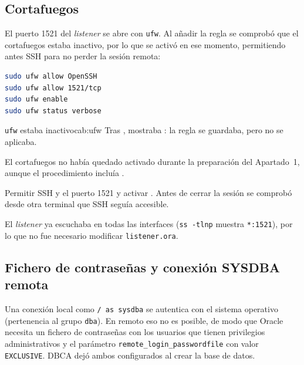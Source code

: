 \subsection{Cortafuegos}

El puerto 1521 del \textit{listener} se abre con \texttt{ufw}. Al añadir la regla se comprobó que el cortafuegos estaba inactivo, por lo que se activó en ese momento, permitiendo antes SSH para no perder la sesión remota:

\begin{lstlisting}[language=bash]
sudo ufw allow OpenSSH
sudo ufw allow 1521/tcp
sudo ufw enable
sudo ufw status verbose
\end{lstlisting}

\begin{cabezazo}{\texttt{ufw} estaba inactivo}{cab:ufw}
\problema Tras ,  mostraba
: la regla se guardaba, pero no se aplicaba.

\causa El cortafuegos no había quedado activado durante la preparación del
Apartado~1, aunque el procedimiento incluía .

\solucion Permitir SSH y el puerto 1521 y activar . Antes de cerrar
la sesión se comprobó desde otra terminal que SSH seguía accesible.
\end{cabezazo}


El \textit{listener} ya escuchaba en todas las interfaces (\texttt{ss -tlnp} muestra \texttt{*:1521}), por lo que no fue necesario modificar \texttt{listener.ora}.

\subsection{Fichero de contraseñas y conexión SYSDBA remota}

Una conexión local como \texttt{/ as sysdba} se autentica con el sistema operativo (pertenencia al grupo \texttt{dba}). En remoto eso no es posible, de modo que Oracle necesita un fichero de contraseñas con los usuarios que tienen privilegios administrativos y el parámetro \texttt{remote\_login\_passwordfile} con valor \texttt{EXCLUSIVE}. DBCA dejó ambos configurados al crear la base de datos.

